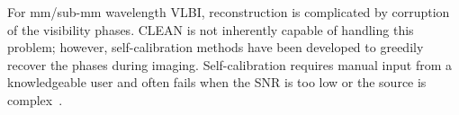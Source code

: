 {For mm/sub-mm wavelength VLBI, reconstruction is complicated by corruption of the visibility phases. CLEAN is not inherently capable of handling this problem; however, self-calibration methods have been developed to greedily recover the phases during imaging. Self-calibration requires manual input from a knowledgeable user and often fails when the SNR is too low or the source is complex~\cite{taylor1999synthesis}. 





 

\vspace{-.15in}
}
